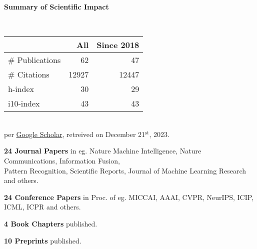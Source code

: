 \headedsection %
{\bf Summary of Scientific Impact}{}{}
{
    \qquad~~~~
    \begin{minipage}[t]{0.6\textwidth}
        \begin{tabular}{lrr}
        \hline
         & All & Since 2018\\
        \hline
        \# Publications & 62     & 47    \\
        \# Citations    & 12927  & 12447 \\
        h-index         & 30     & 29    \\
        i10-index       & 43     & 43    \\
        \hline
    \end{tabular}
    \\
    {\footnotesize{
        per \href{https://scholar.google.com/citations?user=wpLQuroAAAAJ}{Google Scholar},
        retreived on December 21$^\text{st}$, 2023.
        }
    }
    \end{minipage}

    \ifdefined\shortcv
        \vstep
        {\bf 24 Journal Papers} in eg. Nature Machine Intelligence, Nature Communications, Information Fusion,\\
        \hspace*{\fill} Pattern Recognition, Scientific Reports, Journal of Machine Learning Research and others.

        {\bf 24 Conference Papers} in Proc. of eg. MICCAI, AAAI, CVPR, NeurIPS, ICIP, ICML, ICPR and others.

        {\bf 4 Book Chapters} published.

        {\bf 10 Preprints} published.
        
    \else
        {}
    \fi

}
